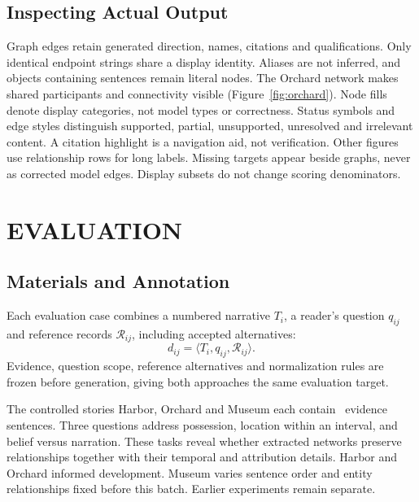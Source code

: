 \documentclass[a4paper,twoside]{article}
\begin{document}
\subsection{Inspecting Actual Output}
\noindent Graph edges retain generated direction, names, citations and qualifications. Only identical endpoint strings share a display identity. Aliases are not inferred, and objects containing sentences remain literal nodes. The Orchard network makes shared participants and connectivity visible (Figure~\ref{fig:orchard}). Node fills denote display categories, not model types or correctness. Status symbols and edge styles distinguish supported, partial, unsupported, unresolved and irrelevant content. A citation highlight is a navigation aid, not verification. Other figures use relationship rows for long labels. Missing targets appear beside graphs, never as corrected model edges. Display subsets do not change scoring denominators.
\FableFigure





\section{\uppercase{Evaluation}}




\subsection{Materials and Annotation}
\noindent Each evaluation case combines a numbered narrative $T_i$, a reader's question $q_{ij}$ and reference records $\mathcal{R}_{ij}$, including accepted alternatives:
\begin{equation}
\label{eq:evaluation-case}
d_{ij} = \langle T_i, q_{ij}, \mathcal{R}_{ij} \rangle .
\end{equation}
Evidence, question scope, reference alternatives and normalization rules are frozen before generation, giving both approaches the same evaluation target.

The controlled stories Harbor, Orchard and Museum each contain \StorySentences\ evidence sentences. Three questions address possession, location within an interval, and belief versus narration. These tasks reveal whether extracted networks preserve relationships together with their temporal and attribution details. Harbor and Orchard informed development. Museum varies sentence order and entity relationships fixed before this batch. Earlier experiments remain separate.
\end{document}
